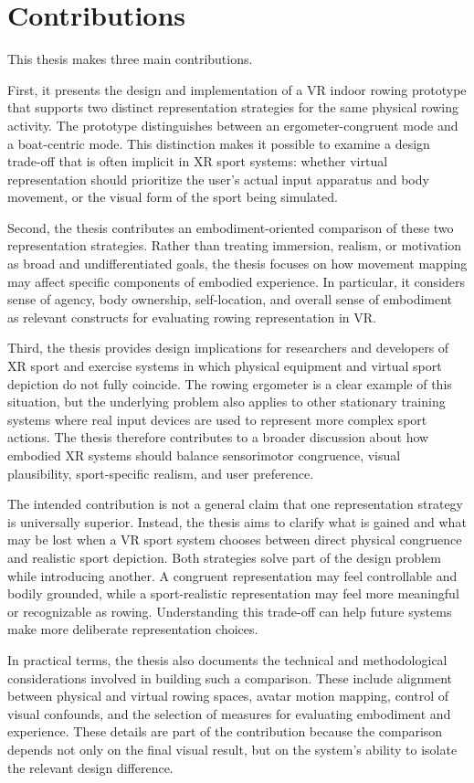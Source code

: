 \section{Contributions}
\label{sec:introduction_contributions}

This thesis makes three main contributions.

First, it presents the design and implementation of a VR indoor rowing prototype that supports two distinct representation strategies for the same physical rowing activity. The prototype distinguishes between an ergometer-congruent mode and a boat-centric mode. This distinction makes it possible to examine a design trade-off that is often implicit in XR sport systems: whether virtual representation should prioritize the user's actual input apparatus and body movement, or the visual form of the sport being simulated.

Second, the thesis contributes an embodiment-oriented comparison of these two representation strategies. Rather than treating immersion, realism, or motivation as broad and undifferentiated goals, the thesis focuses on how movement mapping may affect specific components of embodied experience. In particular, it considers sense of agency, body ownership, self-location, and overall sense of embodiment as relevant constructs for evaluating rowing representation in VR.

Third, the thesis provides design implications for researchers and developers of XR sport and exercise systems in which physical equipment and virtual sport depiction do not fully coincide. The rowing ergometer is a clear example of this situation, but the underlying problem also applies to other stationary training systems where real input devices are used to represent more complex sport actions. The thesis therefore contributes to a broader discussion about how embodied XR systems should balance sensorimotor congruence, visual plausibility, sport-specific realism, and user preference.

The intended contribution is not a general claim that one representation strategy is universally superior. Instead, the thesis aims to clarify what is gained and what may be lost when a VR sport system chooses between direct physical congruence and realistic sport depiction. Both strategies solve part of the design problem while introducing another. A congruent representation may feel controllable and bodily grounded, while a sport-realistic representation may feel more meaningful or recognizable as rowing. Understanding this trade-off can help future systems make more deliberate representation choices.

In practical terms, the thesis also documents the technical and methodological considerations involved in building such a comparison. These include alignment between physical and virtual rowing spaces, avatar motion mapping, control of visual confounds, and the selection of measures for evaluating embodiment and experience. These details are part of the contribution because the comparison depends not only on the final visual result, but on the system's ability to isolate the relevant design difference.
